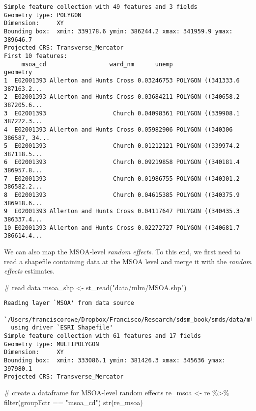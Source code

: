 \documentclass[
  letterpaper,
  krantz2]{style/krantz}
\newenvironment{Shaded}{\begin{snugshade}}{\end{snugshade}}
\newcommand{\CommentTok}[1]{\textcolor[rgb]{0.37,0.37,0.37}{#1}}
\newcommand{\FunctionTok}[1]{\textcolor[rgb]{0.28,0.35,0.67}{#1}}
\newcommand{\NormalTok}[1]{\textcolor[rgb]{0.00,0.23,0.31}{#1}}
\newcommand{\OtherTok}[1]{\textcolor[rgb]{0.00,0.23,0.31}{#1}}
\newcommand{\SpecialCharTok}[1]{\textcolor[rgb]{0.37,0.37,0.37}{#1}}
\newcommand{\StringTok}[1]{\textcolor[rgb]{0.13,0.47,0.30}{#1}}
\begin{document}
\begin{verbatim}
Simple feature collection with 49 features and 3 fields
Geometry type: POLYGON
Dimension:     XY
Bounding box:  xmin: 339178.6 ymin: 386244.2 xmax: 341959.9 ymax: 389646.7
Projected CRS: Transverse_Mercator
First 10 features:
     msoa_cd                  ward_nm      unemp                       geometry
1  E02001393 Allerton and Hunts Cross 0.03246753 POLYGON ((341333.6 387163.2...
2  E02001393 Allerton and Hunts Cross 0.03684211 POLYGON ((340658.2 387205.6...
3  E02001393                   Church 0.04098361 POLYGON ((339908.1 387222.3...
4  E02001393 Allerton and Hunts Cross 0.05982906 POLYGON ((340306 386587, 34...
5  E02001393                   Church 0.01212121 POLYGON ((339974.2 387118.5...
6  E02001393                   Church 0.09219858 POLYGON ((340181.4 386957.8...
7  E02001393                   Church 0.01986755 POLYGON ((340301.2 386582.2...
8  E02001393                   Church 0.04615385 POLYGON ((340375.9 386918.6...
9  E02001393 Allerton and Hunts Cross 0.04117647 POLYGON ((340435.3 386337.4...
10 E02001393 Allerton and Hunts Cross 0.02272727 POLYGON ((340681.7 386614.4...
\end{verbatim}

We can also map the MSOA-level \emph{random effects}. To this end, we
first need to read a shapefile containing data at the MSOA level and
merge it with the \emph{random effects} estimates.

\begin{Shaded}
\begin{Highlighting}[]
\CommentTok{\# read data}
\NormalTok{msoa\_shp }\OtherTok{\textless{}{-}} \FunctionTok{st\_read}\NormalTok{(}\StringTok{"data/mlm/MSOA.shp"}\NormalTok{)}
\end{Highlighting}
\end{Shaded}

\begin{verbatim}
Reading layer `MSOA' from data source 
  `/Users/franciscorowe/Dropbox/Francisco/Research/sdsm_book/smds/data/mlm/MSOA.shp' 
  using driver `ESRI Shapefile'
Simple feature collection with 61 features and 17 fields
Geometry type: MULTIPOLYGON
Dimension:     XY
Bounding box:  xmin: 333086.1 ymin: 381426.3 xmax: 345636 ymax: 397980.1
Projected CRS: Transverse_Mercator
\end{verbatim}

\begin{Shaded}
\begin{Highlighting}[]
\CommentTok{\# create a dataframe for MSOA{-}level random effects}
\NormalTok{re\_msoa }\OtherTok{\textless{}{-}}\NormalTok{ re }\SpecialCharTok{\%\textgreater{}\%} \FunctionTok{filter}\NormalTok{(groupFctr }\SpecialCharTok{==} \StringTok{"msoa\_cd"}\NormalTok{)}
\FunctionTok{str}\NormalTok{(re\_msoa)}
\end{Highlighting}
\end{Shaded}
\end{document}
